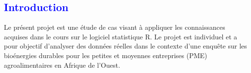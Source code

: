 \documentclass[
]{article}
\author{}
\date{\vspace{-2.5em}}
\begin{document}


\newpage



\newpage


\renewcommand{\contentsname}{\textcolor{blue}{Table des matières}}

\textcolor{blue}{\tableofcontents}

\newpage

\textcolor{blue}{\section*{Introduction}}

Le présent projet est une étude de cas visant à appliquer les
connaissances acquises dans le cours sur le logiciel statistique R. Le
projet est individuel et a pour objectif d'analyser des données réelles
dans le contexte d'une enquête sur les bioénergies durables pour les
petites et moyennes entreprises (PME) agroalimentaires en Afrique de
l'Ouest.
\end{document}
